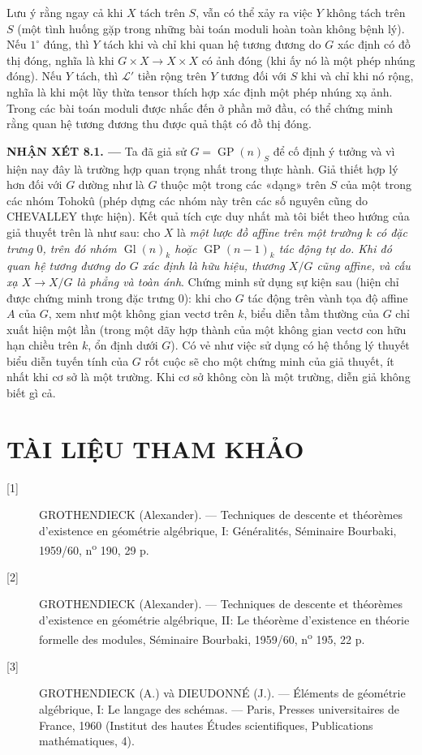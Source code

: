 Lưu ý rằng ngay cả khi $X$ tách trên $S$, vẫn có thể xảy ra việc $Y$ không
tách trên $S$ (một tình huống gặp trong những bài toán moduli hoàn toàn không
bệnh lý). Nếu $1^\circ$ đúng, thì $Y$ tách khi và chỉ khi quan hệ tương đương
do $G$ xác định có đồ thị đóng, nghĩa là khi $G\times X\to X\times X$ có ảnh
đóng (khi ấy nó là một phép nhúng đóng). Nếu $Y$ tách, thì $\mathcal L'$ tiền
rộng trên $Y$ tương đối với $S$ khi và chỉ khi nó rộng, nghĩa là khi một lũy
thừa tensor thích hợp xác định một phép nhúng xạ ảnh. Trong các bài toán moduli
được nhắc đến ở phần mở đầu, có thể chứng minh rằng quan hệ tương đương thu
được quả thật có đồ thị đóng.

\medskip
\noindent\textbf{NHẬN XÉT 8.1. ---} Ta đã giả sử
$G=\operatorname{GP}(n)_S$ để cố định ý tưởng và vì hiện nay đây là trường hợp
quan trọng nhất trong thực hành. Giả thiết hợp lý hơn đối với $G$ dường như là
$G$ thuộc một trong các «dạng» trên $S$ của một trong các nhóm Tohokû (phép
dựng các nhóm này trên các số nguyên cũng do CHEVALLEY thực hiện). Kết quả tích
cực duy nhất mà tôi biết theo hướng của giả thuyết trên là như sau: cho $X$ là
\emph{một lược đồ affine trên một trường $k$ có đặc trưng $0$, trên đó nhóm
$\operatorname{Gl}(n)_k$ hoặc $\operatorname{GP}(n-1)_k$ tác động tự do. Khi
đó quan hệ tương đương do $G$ xác định là hữu hiệu, thương $X/G$ cũng affine,
và cấu xạ $X\to X/G$ là phẳng và toàn ánh}. Chứng minh sử dụng sự kiện sau
(hiện chỉ được chứng minh trong đặc trưng $0$): khi cho $G$ tác động trên vành
tọa độ affine $A$ của $G$, xem như một không gian vectơ trên $k$, biểu diễn tầm
thường của $G$ chỉ xuất hiện một lần (trong một dãy hợp thành của một không
gian vectơ con hữu hạn chiều trên $k$, ổn định dưới $G$). Có vẻ như việc sử
dụng có hệ thống
lý thuyết biểu diễn tuyến tính của $G$ rốt cuộc sẽ cho một chứng minh của
giả thuyết, ít nhất khi cơ sở là một trường. Khi cơ sở không còn là một trường,
diễn giả không biết gì cả.

\section*{TÀI LIỆU THAM KHẢO}

\begin{description}
\item[{[1]}] GROTHENDIECK (Alexander). --- Techniques de descente et théorèmes
d'existence en géométrie algébrique, I: Généralités, Séminaire Bourbaki,
1959/60, n\textsuperscript{o} 190, 29 p.

\item[{[2]}] GROTHENDIECK (Alexander). --- Techniques de descente et théorèmes
d'existence en géométrie algébrique, II: Le théorème d'existence en théorie
formelle des modules, Séminaire Bourbaki, 1959/60,
n\textsuperscript{o} 195, 22 p.

\item[{[3]}] GROTHENDIECK (A.) và DIEUDONNÉ (J.). --- Éléments de géométrie
algébrique, I: Le langage des schémas. --- Paris, Presses universitaires de
France, 1960 (Institut des hautes Études scientifiques, Publications
mathématiques, 4).
\end{description}

\par
